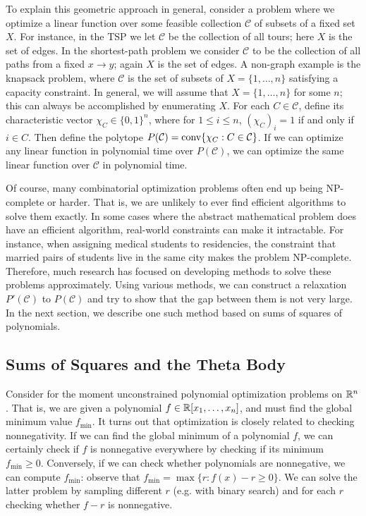 To explain this geometric approach in general, consider a problem where we optimize a linear function over some feasible collection $\mathcal{C}$ of subsets of a fixed set $X$.
For instance, in the TSP we let $\mathcal{C}$ be the collection of all tours; here $X$ is the set of edges.
In the shortest-path problem we consider $\mathcal{C}$ to be the collection of all paths from a fixed $x \to y$; again $X$ is the set of edges.
A non-graph example is the knapsack problem, where $\mathcal{C}$ is the set of subsets of $X = \{1, \ldots, n\}$ satisfying a capacity constraint.
In general, we will assume that $X = \{1, \ldots, n\}$ for some $n$; this can always be accomplished by enumerating $X$.
For each $C \in \mathcal{C}$, define its characteristic vector $\chi_C \in \{0,1\}^n$, where for $1 \le i \le n$, $(\chi_C)_i = 1$ if and only if $i \in C$.
Then define the polytope $P(\mathcal{C}) = \hbox{conv} \{\chi_C: C \in \mathcal{C}\}$.
If we can optimize any linear function in polynomial time over $P(\mathcal{C})$, we can optimize the same linear function over $\mathcal{C}$ in polynomial time.

Of course, many combinatorial optimization problems often end up being NP-complete or harder. 
That is, we are unlikely to ever find efficient algorithms to solve them exactly.
In some cases where the abstract mathematical problem does have an efficient algorithm, real-world constraints can make it intractable. 
For instance, when assigning medical students to residencies, the constraint that married pairs of students live in the same city makes the problem NP-complete.
Therefore, much research has focused on developing methods to solve these problems approximately. 
Using various methods, we can construct a relaxation $P'(\mathcal{C})$ to $ P(\mathcal{C})$ and try to show that the gap between them is not very large.
In the next section, we describe one such method based on sums of squares of polynomials.

\subsection{Sums of Squares and the Theta Body}
\label{section:introtheta}
Consider for the moment unconstrained polynomial optimization problems on $\mathbb{R}^n$. 
That  is, we are given a polynomial $f \in \mathbb{R}[x_1, \ldots, x_n]$, and must find the global minimum value $f_{\min}$. 
It turns out that optimization is closely related to checking nonnegativity.
If we can find the global minimum of a polynomial $f$, we can certainly check if $f$ is nonnegative everywhere by checking if its minimum $f_{\min} \ge 0$.
Conversely, if we can check whether polynomials are nonnegative, we can compute $f_{\min}$: observe that $f_{\min} = \max \{r: f(x) - r \ge 0\}$. 
We can solve the latter problem by sampling different $r$ (e.g. with binary search) and for each $r$ checking whether $f - r$ is nonnegative.

